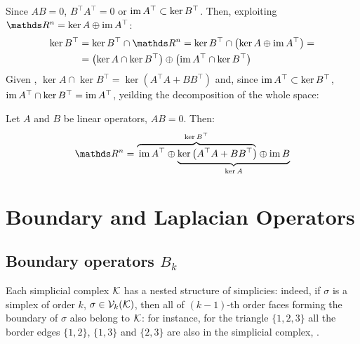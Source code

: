 

Since \( A B = 0\), \( B^\top A^\top = 0 \) or \( \operatorname{im} A^\top \subset \ker B^\top \). Then, exploiting \( \ds R^n = \ker A \oplus \im A^\top \): 
\begin{equation}
      \begin{aligned}
            \ker B^\top & = \ker B^\top \cap \ds R^n = \ker B^\top \cap \left( \ker A \oplus \im A^\top \right) = \\
            & = \left( \ker A \cap \ker B^\top \right) \oplus \left( \im A^\top \cap \ker B^\top \right)
      \end{aligned}
\end{equation}
Given , \( \ker A \cap \ker B^\top = \ker \left(  A^\top A + B B^\top \right) \) and, since \( \operatorname{im} A^\top \subset \ker B^\top \), \( \operatorname{im} A^\top \cap \ker B^\top = \operatorname{im} A^\top \), yeilding the decomposition of  the whole space:
\begin{theorem}\label{thm:hodge_decomposition}
      Let \( A \) and \( B \) be linear operators, \( A B = 0 \). Then:
      \begin{equation}
            \ds R^n = \lefteqn{\overbrace{\phantom{\im A^\top \oplus  \ker \left( A^\top A + B B^\top \right)}}^{\ker B^\top}} \im A^\top \oplus
            \underbrace{\ker \left( A^\top A + B B^\top \right) \oplus  \im B}_{\ker A}
      \end{equation}
      \vspace{-\baselineskip}
\end{theorem}





\section{ Boundary and Laplacian Operators }

\subsection{Boundary operators \( B_k \)}

Each simplicial complex \( \mathcal{K} \) has a nested structure of simplicies: indeed, if \( \sigma \) is a simplex of order \( k \), \( \sigma \in \mathcal{V}_{k}(\mathcal{K}) \), then all of \( (k-1)\)-th order faces forming the boundary of \( \sigma \) also belong to \( \mathcal{K} \): for instance, for the triangle \( \{ 1, 2, 3  \} \) all the border edges \( \{ 1, 2\} \), \( \{ 1, 3\}\) and \( \{ 2, 3 \}\) are also in the simplicial complex, . 

